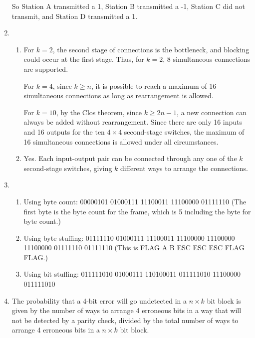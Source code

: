 \documentclass{article}
\begin{document}
\begin{enumerate}
So Station A transmitted a 1, Station B transmitted a -1, Station C did not transmit, and Station D transmitted a 1.

\item
\begin{enumerate}

\item For $k=2$, the second stage of connections is the bottleneck, and blocking could occur at the first stage. Thus, for $k=2$, 8 simultaneous connections are supported.

For $k=4$, since $k \geq n$, it is possible to reach a maximum of 16 simultaneous connections as long as rearrangement is allowed.

For $k=10$, by the Clos theorem, since $k \geq 2n-1$, a new connection can always be added without rearrangement. Since there are only 16 inputs and 16 outputs for the ten $4 \times 4$ second-stage switches, the maximum of 16 simultaneous connections is allowed under all circumstances.

\item Yes. Each input-output pair can be connected through any one of the $k$ second-stage switches, giving $k$ different ways to arrange the connections.

\end{enumerate}

\item
\begin{enumerate}

\item Using byte count:  00000101 01000111 11100011 11100000 01111110 (The first byte is the byte count for the frame, which is 5 including the byte for byte count.)

\item Using byte stuffing: 01111110 01000111 11100011 11100000 11100000 11100000 01111110 01111110
(This is FLAG A B ESC ESC ESC FLAG FLAG.) 

\item Using bit stuffing: 011111010 01000111 110100011 011111010 11100000 011111010

\end{enumerate}

\item The probability that a 4-bit error will go undetected in a $n \times k$ bit block is given by the number of ways to arrange 4 erroneous bits in a way that will not be detected by a parity check, divided by the total number of ways to arrange 4 erroneous bits in a $n \times k$ bit block. \\


\end{enumerate}
\end{document}
